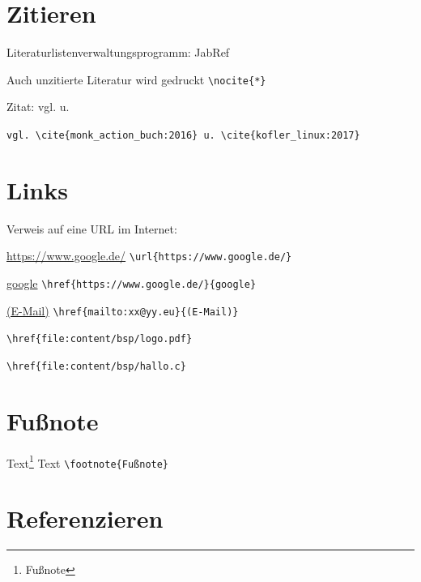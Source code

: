 

\section{Zitieren}\label{zitieren}

Literaturlistenverwaltungsprogramm: JabRef 


\nocite{*} Auch unzitierte Literatur wird gedruckt \verb|\nocite{*}|

Zitat: vgl. \cite{monk_action_buch:2016} u. \cite{kofler_linux:2017} 

\verb|vgl. \cite{monk_action_buch:2016} u. \cite{kofler_linux:2017}| 


\section{Links}\label{sec:links}

Verweis auf eine URL im Internet: 

\url{https://www.google.de/}
\verb|\url{https://www.google.de/}|

\href{https://www.google.de/}{google}
\verb|\href{https://www.google.de/}{google}|


\href{mailto:xx@yy.eu}{(E-Mail)} 
\verb|\href{mailto:xx@yy.eu}{(E-Mail)}|


\href{file:content/bsp/logo.pdf}{}
\verb|\href{file:content/bsp/logo.pdf}|

\href{file:content/bsp/hallo.c}{}
\verb|\href{file:content/bsp/hallo.c}|


\section{Fußnote}

Text\footnote{Fußnote} Text
\verb|\footnote{Fußnote}|

\section{Referenzieren}\label{referenzieren}

